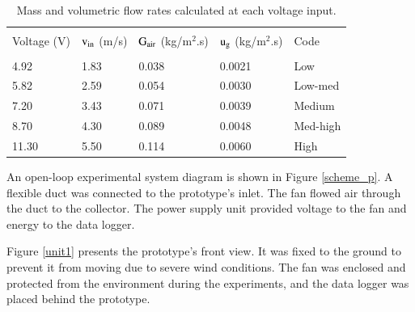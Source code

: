 \begin{table}[!ht]
	\caption{Mass and volumetric flow rates calculated at each voltage input.}
	\centering
	\begin{tabular}{p{2.1cm}p{1.8cm}p{2.4cm}p{2.2cm}p{1.8cm}}
		\hline \\[-10pt] 
		\rule[-1ex]{0pt}{2.5ex} Voltage (V) & ${\rm v_{in}}$ (m/s) & $\rm{G_{air}}$ (kg/m$^2$.s) & ${\rm u_{g}}$ (kg/m$^2$.s)  & Code \\ [3pt]
		\hline \\[-10pt]
		\rule[-1ex]{0pt}{2.5ex} 4.92 & 1.83 & 0.038 & 0.0021 & Low\\ [5pt]
		\rule[-1ex]{0pt}{2.5ex} 5.82 & 2.59 & 0.054 & 0.0030 & Low-med \\ [5pt] 
		\rule[-1ex]{0pt}{2.5ex} 7.20 & 3.43 & 0.071 & 0.0039 & Medium \\ [5pt]
		\rule[-1ex]{0pt}{2.5ex} 8.70 & 4.30 & 0.089 & 0.0048 & Med-high  \\ [5pt]
		\rule[-1ex]{0pt}{2.5ex} 11.30 & 5.50 & 0.114 & 0.0060 & High \\ [2pt]
		\hline 
	\end{tabular} 
	\label{GxV}
\end{table}





An open-loop experimental system diagram is shown in Figure \ref{scheme_p}. A flexible duct was connected to the prototype's inlet. The fan flowed air through the duct to the collector. The power supply unit provided voltage to the fan and energy to the data logger.


Figure \ref{unit1} presents the prototype's front view. It was fixed to the ground to prevent it from moving due to severe wind conditions. The fan was enclosed and protected from the environment during the experiments, and the data logger was placed behind the prototype.

